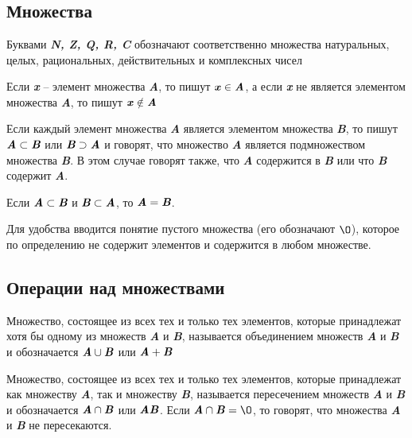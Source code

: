 \documentclass{article}
\begin{document}
    \onehalfspacing

    \section*{}
    \subsection*{Множества}

    \fontsize{13}{10}\selectfont Буквами \textit{\textbf{N, Z, Q, R, C}} обозначают соответственно множества натуральных, целых, рациональных, действительных и комплексных чисел

    Если \textit{\textbf{x}} -- элемент множества \textit{\textbf{A}}, то пишут $\textbf{\textit{x}} \in \textbf{\textit{A}}$, а если \textit{\textbf{x}} не является элементом множества \textit{\textbf{A}}, то пишут $\textbf{\textit{x}} \notin \textbf{\textit{A}}$

    Если каждый элемент множества \textit{\textbf{A}} является элементом множества \textit{\textbf{B}}, то пишут $\textit{\textbf{A}} \subset \textit{\textbf{B}}$ или $\textit{\textbf{B}} \supset \textit{\textbf{A}}$ и говорят, что множество \textit{\textbf{A}} является подмножеством множества \textit{\textbf{B}}. В этом случае говорят также, что \textit{\textbf{A}} содержится в \textit{\textbf{B}} или что \textit{\textbf{B}} содержит \textit{\textbf{A}}.

    Если $\textit{\textbf{A}} \subset \textit{\textbf{B}}$ и $\textit{\textbf{B}} \subset \textit{\textbf{A}}$, то $\textit{\textbf{A}} = \textit{\textbf{B}}$.

    Для удобства вводится понятие пустого множества (его обозначают $\O$), которое по определению не содержит элементов и содержится в любом множестве.

    \subsection*{Операции над множествами}

    \fontsize{13}{10}\selectfont Множество, состоящее из всех тех и только тех элементов, которые принадлежат хотя бы одному из множеств \textit{\textbf{A}} и \textit{\textbf{B}}, называется
    объединением множеств \textit{\textbf{A}} и \textit{\textbf{B}} и обозначается $\textbf{\textit{A}} \cup \textbf{\textit{B}}$ или $\textbf{\textit{A}} + \textbf{\textit{B}}$

    Множество, состоящее из всех тех и только тех элементов, которые принадлежат как множеству \textit{\textbf{A}}, так и множеству \textit{\textbf{B}}, называется пересечением множеств \textit{\textbf{A}} и \textit{\textbf{B}} и обозначается $\textbf{\textit{A}} \cap \textbf{\textit{B}}$ или $\textbf{\textit{A}}\textbf{\textit{B}}$. Если $\textbf{\textit{A}} \cap \textbf{\textit{B}} = \O$, то говорят, что множества \textit{\textbf{A}} и \textit{\textbf{B}} не пересекаются.
\end{document}
